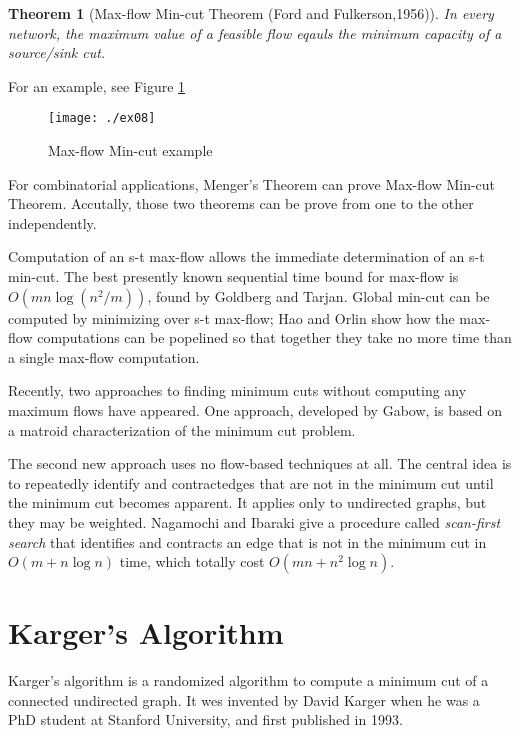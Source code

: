 \documentclass[11pt]{article}
\theoremstyle{plain}
\newtheorem{thm}{Theorem}[section]
\theoremstyle{definition}
\theoremstyle{remark}
\begin{document}
\begin{thm}[Max-flow Min-cut Theorem (Ford and Fulkerson,1956)] 
In every network, the maximum value of a feasible flow eqauls the minimum capacity of a source/sink cut.
\end{thm}

For an example, see Figure \ref{fig:ex08}

\begin{figure}[h]
\centering
\texttt{[image: ./ex08]}
\caption{Max-flow Min-cut example}
\label{fig:ex08}
\end{figure}

For combinatorial applications, Menger's Theorem can prove Max-flow Min-cut Theorem. Accutally, those two theorems can be prove from one to the other independently.

Computation of an s-t max-flow allows the immediate determination of an s-t min-cut. The best presently known sequential time bound for max-flow is $ O(mn\log(n^2/m)) $, found by Goldberg and Tarjan\cite{goldberg1988new}. Global min-cut can be computed by minimizing over s-t max-flow; Hao and Orlin\cite{hao1994faster} show how the max-flow computations can be popelined so that together they take no more time than a single max-flow computation.

Recently, two approaches to finding minimum cuts without computing any maximum flows have appeared. One approach, developed by Gabow\cite{gabow1991matroid}, is based on a matroid characterization of the minimum cut problem. 

The second new approach uses no flow-based techniques at all. The central idea is to repeatedly identify and contractedges that are not in the minimum cut until the minimum cut becomes apparent. It applies only to undirected graphs, but they may be weighted. Nagamochi and Ibaraki \cite{nagamochi1992computing} give a procedure called \textit{scan-first search} that identifies and contracts an edge that is not in the minimum cut in $ O(m+n\log n) $ time, which totally cost $ O(mn+n^2\log n) $.

\section{Karger's Algorithm}

Karger's algorithm is a randomized algorithm to compute a minimum cut of a connected undirected graph. It wes invented by David Karger when he was a PhD student at Stanford University, and first published in 1993\cite{karger1993global}. 
\end{document}
